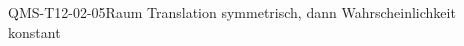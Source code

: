 
\begin{CONC}{QMS-T12-02-05}{Raum Translation symmetrisch, dann Wahrscheinlichkeit konstant}
\end{CONC}
